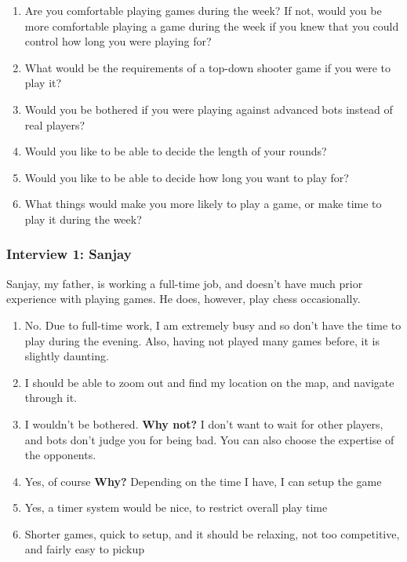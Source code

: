 \vs
\begin{enumerate}[label=\arabic*)]
    \item Are you comfortable playing games during the week?
    \subitem If not, would you be more comfortable playing a game during the week if you knew that you could control how long you were playing for?
    \item What would be the requirements of a top-down shooter game if you were to play it?
    \item Would you be bothered if you were playing against advanced bots instead of real players?
    \item Would you like to be able to decide the length of your rounds?
    \item Would you like to be able to decide how long you want to play for?
    \item What things would make you more likely to play a game, or make time to play it during the week?
\end{enumerate}

\vs
\subsubsection{Interview 1: Sanjay}
Sanjay, my father, is working a full-time job, and doesn't have much prior experience with playing games. He does, however, play chess occasionally.
\begin{enumerate}[label=\arabic*)]
    \item No. Due to full-time work, I am extremely busy and so don't have the time to play during the evening. Also, having not played many games before, it is slightly daunting.
    \item I should be able to zoom out and find my location on the map, and navigate through it.
    \item I wouldn't be bothered.
    \subitem \textbf{Why not?} I don't want to wait for other players, and bots don't judge you for being bad. You can also choose the expertise of the opponents.
    \item Yes, of course
    \subitem \textbf{Why?} Depending on the time I have, I can setup the game
    \item Yes, a timer system would be nice, to restrict overall play time
    \item Shorter games, quick to setup, and it should be relaxing, not too competitive, and fairly easy to pickup
\end{enumerate}


